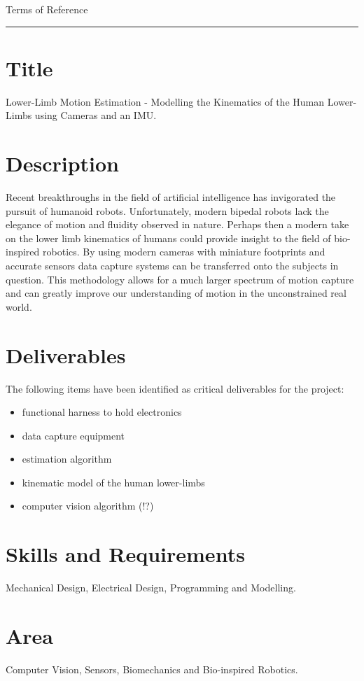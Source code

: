 \pagestyle{plain}


{\Large Terms of Reference}\\
\hrule
\vskip 5mm

\section*{Title}
  Lower-Limb Motion Estimation - Modelling the Kinematics of the Human Lower-Limbs using Cameras and an IMU.

\section*{Description}
Recent breakthroughs in the field of artificial intelligence has invigorated the pursuit of humanoid robots. Unfortunately, modern bipedal robots lack the elegance of motion and fluidity observed in nature. Perhaps then a modern take on the lower limb kinematics of humans could provide insight to the field of bio-inspired robotics. By using modern cameras with miniature footprints and accurate sensors data capture systems can be transferred onto the subjects in question. This methodology allows for a much larger spectrum of motion capture and can greatly improve our understanding of motion in the unconstrained real world.

\section*{Deliverables}
The following items have been identified as critical deliverables for the project:

\begin{itemize}
  \item functional harness to hold electronics
  \item data capture equipment
  \item	estimation algorithm
  \item kinematic model of the human lower-limbs
  \item computer vision algorithm (!?)
\end{itemize}


\section*{Skills and Requirements}
  Mechanical Design, Electrical Design, Programming and Modelling.

\section*{Area}
  Computer Vision, Sensors, Biomechanics and Bio-inspired Robotics.

